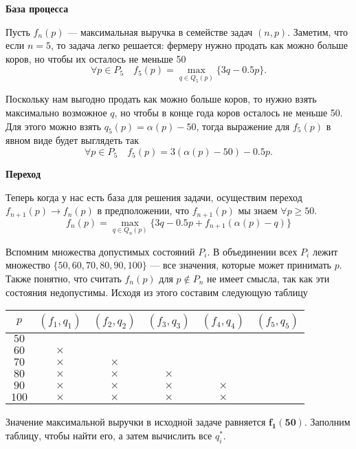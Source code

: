 \bigskip

\textbf{База процесса}

Пусть $f_n(p)$ --- максимальная выручка в семействе задач $(n, p)$. Заметим, что если $n = 5$, то задача легко решается: фермеру нужно продать как можно больше коров, но чтобы их осталось не меньше 50
\[
\forall p \in P_5 \quad f_5(p) = \max_{q \in Q_5(p)} \{3q - 0.5p\}.
\]

Поскольку нам выгодно продать как можно больше коров, то нужно взять максимально возможное $q$, но чтобы в конце года коров осталось не меньше 50. Для этого можно взять $q_5(p) = \alpha(p) - 50$, тогда выражение для $f_5(p)$ в явном виде будет выглядеть так
\[
\forall p \in P_5 \quad f_5(p) = 3(\alpha(p) - 50) - 0.5p.
\]

\bigskip

\textbf{Переход}

Теперь когда у нас есть база для решения задачи, осуществим переход $f_{n+1}(p) \to f_n(p)$ в предположении, что $f_{n+1}(p)$ мы знаем $\forall p \ge 50$.
\[
\boxed{f_n(p) = \max_{q \in Q_n(p)} \Big\{3q - 0.5p + f_{n + 1}(\alpha(p) - q)\Big\}}\tag{**}
\]

Вспомним множества допустимых состояний $P_i$. В объединении всех $P_i$ лежит множество $\{50, 60, 70, 80, 90, 100\}$ --- все значения, которые может принимать $p$. Также понятно, что считать $f_n(p)$ для $p \notin P_n$ не имеет смысла, так как эти состояния недопустимы. Исходя из этого составим следующую таблицу

\begin{table}[H]
	\centering
	\begin{tabular}{ | c | c | c | c | c | c | } 
		\hline
		$p$ & $(f_1, q_1)$ & $(f_2, q_2)$ & $(f_3, q_3)$ & $(f_4, q_4)$ & $(f_5, q_5)$ \\ 
		\hline
		$50$ & & & & & \\\hline
		$60$ & $\times$ & & & & \\\hline
		$70$ & $\times$ & $\times$ & & & \\\hline
		$80$ & $\times$ & $\times$ & $\times$ & & \\\hline
		$90$ & $\times$ & $\times$ & $\times$ & $\times$ & \\\hline
		$100$ & $\times$ & $\times$ & $\times$ & $\times$ & \\\hline
	\end{tabular}
\end{table}

Значение максимальной выручки в исходной задаче равняется $\mathbf {f_1(50)}$. Заполним таблицу, чтобы найти его, а затем вычислить все $q^*_i$.

